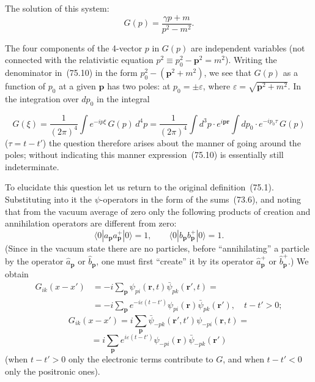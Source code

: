 The solution of this system:
\begin{equation}
G(p) = \frac{\gamma p + m}{p^2 - m^2}.
\tag{75.10}
\end{equation}

The four components of the 4-vector $p$ in $G(p)$ are independent variables (not connected with the relativistic equation $p^2 \equiv p_0^2 - \mathbf{p}^2 = m^2$). Writing the denominator in~(75.10) in the form $p_0^2 - (\mathbf{p}^2 + m^2)$, we see that $G(p)$ as a function of $p_0$ at a given $\mathbf{p}$ has two poles: at $p_0 = \pm\varepsilon$, where $\varepsilon = \sqrt{\mathbf{p}^2 + m^2}$. In the integration over $dp_0$ in the integral

\begin{equation}
G(\xi) = \frac{1}{(2\pi)^4}\int e^{-ip\xi}\,G(p)\,d^4p = \frac{1}{(2\pi)^4}\int d^3p\cdot e^{i\mathbf{p}\mathbf{r}}\int dp_0\cdot e^{-ip_0\tau}\,G(p)
\tag{75.11}
\end{equation}
($\tau = t - t'$) the question therefore arises about the manner of going around the poles; without indicating this manner expression~(75.10) is essentially still indeterminate.

To elucidate this question let us return to the original definition~(75.1). Substituting into it the $\psi$-operators in the form of the sums~(73.6), and noting that from the vacuum average of zero only the following products of creation and annihilation operators are different from zero:
\[
\langle 0|a_\mathbf{p} a_\mathbf{p}^+|0\rangle = 1,\qquad \langle 0|b_\mathbf{p} b_\mathbf{p}^+|0\rangle = 1.
\]
(Since in the vacuum state there are no particles, before ``annihilating'' a particle by the operator $\hat{a}_\mathbf{p}$ or $\hat{b}_\mathbf{p}$, one must first ``create'' it by its operator $\hat{a}_\mathbf{p}^+$ or $\hat{b}_\mathbf{p}^+$.) We obtain
\begin{equation}
\begin{split}
G_{ik}(x - x') &= -i\sum_\mathbf{p}\psi_{pi}(\mathbf{r},t)\bar{\psi}_{pk}(\mathbf{r}',t) =\\
&= -i\sum_\mathbf{p}e^{-i\varepsilon(t-t')}\psi_{pi}(\mathbf{r})\bar{\psi}_{pk}(\mathbf{r}'),\quad t - t' > 0;
\end{split}
\tag{75.12}
\end{equation}
\[
G_{ik}(x - x') = i\sum_\mathbf{p}\bar{\psi}_{-pk}(\mathbf{r}',t')\psi_{-pi}(\mathbf{r},t) =
\]
\[
= i\sum_\mathbf{p}e^{i\varepsilon(t-t')}\psi_{-pi}(\mathbf{r})\bar{\psi}_{-pk}(\mathbf{r}')
\]
(when $t - t' > 0$ only the electronic terms contribute to $G$, and when $t - t' < 0$ only the positronic ones).

